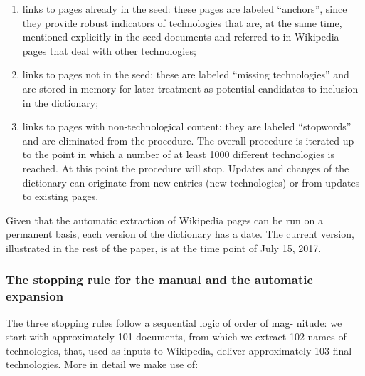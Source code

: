 \documentclass[]{book}
\providecommand{\tightlist}{%
  \setlength{\itemsep}{0pt}\setlength{\parskip}{0pt}}
\begin{document}
\begin{enumerate}
\def\labelenumi{\alph{enumi}.}
\tightlist
\item
  links to pages already in the seed: these pages are labeled
  ``anchors'', since they provide robust indicators of technologies that
  are, at the same time, mentioned explicitly in the seed documents and
  referred to in Wikipedia pages that deal with other technologies;
\item
  links to pages not in the seed: these are labeled ``missing
  technologies'' and are stored in memory for later treatment as
  potential candidates to inclusion in the dictionary;
\item
  links to pages with non-technological content: they are labeled
  ``stopwords'' and are eliminated from the procedure. The overall
  procedure is iterated up to the point in which a number of at least
  1000 different technologies is reached. At this point the procedure
  will stop. Updates and changes of the dictionary can originate from
  new entries (new technologies) or from updates to existing pages.
\end{enumerate}

Given that the automatic extraction of Wikipedia pages can be run on a
permanent basis, each version of the dictionary has a date. The current
version, illustrated in the rest of the paper, is at the time point of
July 15, 2017.

\subsubsection*{The stopping rule for the manual and the automatic
expansion}\label{the-stopping-rule-for-the-manual-and-the-automatic-expansion}

The three stopping rules follow a sequential logic of order of mag-
nitude: we start with approximately 101 documents, from which we extract
102 names of technologies, that, used as inputs to Wikipedia, deliver
approximately 103 final technologies. More in detail we make use of:
\end{document}
